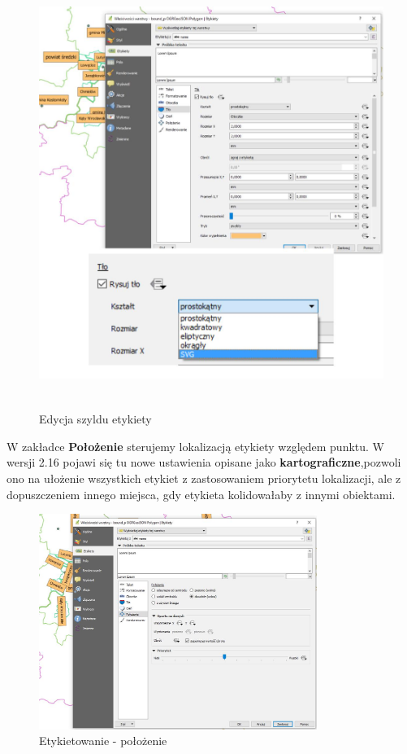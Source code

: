 \documentclass[12pt,a4paper]{book}
\begin{document}
\begin{center}
\begin{figure}
\includegraphics[width=13cm,height=13.988cm]{007-etykiety-szyld.jpg}
\caption{Edycja szyldu etykiety}
\end{figure}
\end{center}
W zakładce \textbf{Położenie }sterujemy lokalizacją etykiety względem punktu. W wersji 2.16 pojawi się tu nowe ustawienia opisane jako \textbf{kartograficzne},pozwoli ono na ułożenie wszystkich etykiet z zastosowaniem priorytetu lokalizacji, ale z dopuszczeniem innego miejsca, gdy etykieta kolidowałaby z innymi obiektami.
\begin{figure}[ht]
	\centering
	\includegraphics[height=7cm]{007-etykiety-polozenie.jpg}
	\caption{Etykietowanie - położenie}
\end{figure}
\end{document}
